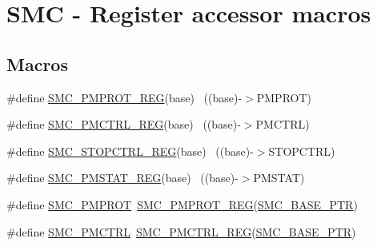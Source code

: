 \hypertarget{group___s_m_c___register___accessor___macros}{}\section{S\+MC -\/ Register accessor macros}
\label{group___s_m_c___register___accessor___macros}
\subsection*{Macros}
\begin{DoxyCompactItemize}
\item 
\#define \hyperlink{group___s_m_c___register___accessor___macros_ga376601b24e540392f6d12424bdaebab4}{S\+M\+C\+\_\+\+P\+M\+P\+R\+O\+T\+\_\+\+R\+EG}(base)                                      ~((base)-\/$>$P\+M\+P\+R\+OT)
\item 
\#define \hyperlink{group___s_m_c___register___accessor___macros_gaa927c65bb4333cf1bcff0d5fa57d8034}{S\+M\+C\+\_\+\+P\+M\+C\+T\+R\+L\+\_\+\+R\+EG}(base)                                      ~((base)-\/$>$P\+M\+C\+T\+RL)
\item 
\#define \hyperlink{group___s_m_c___register___accessor___macros_gaa5acb017ede815ab56f09a505bc276c2}{S\+M\+C\+\_\+\+S\+T\+O\+P\+C\+T\+R\+L\+\_\+\+R\+EG}(base)                                  ~((base)-\/$>$S\+T\+O\+P\+C\+T\+RL)
\item 
\#define \hyperlink{group___s_m_c___register___accessor___macros_ga77ded725e1d8ccc2781a0ee6dffc8809}{S\+M\+C\+\_\+\+P\+M\+S\+T\+A\+T\+\_\+\+R\+EG}(base)                                      ~((base)-\/$>$P\+M\+S\+T\+AT)
\item 
\#define \hyperlink{group___s_m_c___register___accessor___macros_ga43f6628ef790c765722cee208c2c477d}{S\+M\+C\+\_\+\+P\+M\+P\+R\+OT}~\hyperlink{group___s_m_c___register___accessor___macros_ga376601b24e540392f6d12424bdaebab4}{S\+M\+C\+\_\+\+P\+M\+P\+R\+O\+T\+\_\+\+R\+EG}(\hyperlink{group___s_m_c___peripheral_ga31b6c4571795341e6446800243313e56}{S\+M\+C\+\_\+\+B\+A\+S\+E\+\_\+\+P\+TR})
\item 
\#define \hyperlink{group___s_m_c___register___accessor___macros_ga4b2bae0309aecee21e9fe70ac7dbe3dc}{S\+M\+C\+\_\+\+P\+M\+C\+T\+RL}~\hyperlink{group___s_m_c___register___accessor___macros_gaa927c65bb4333cf1bcff0d5fa57d8034}{S\+M\+C\+\_\+\+P\+M\+C\+T\+R\+L\+\_\+\+R\+EG}(\hyperlink{group___s_m_c___peripheral_ga31b6c4571795341e6446800243313e56}{S\+M\+C\+\_\+\+B\+A\+S\+E\+\_\+\+P\+TR})
\item 

\end{DoxyCompactItemize}
